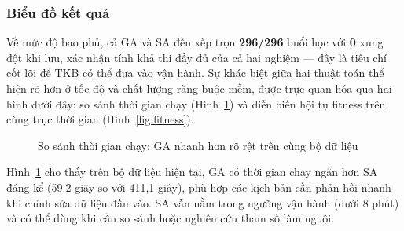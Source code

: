 \documentclass[a4paper,12pt,oneside]{article}
\begin{document}
	\subsubsection{Biểu đồ kết quả}
	
	Về mức độ bao phủ, cả GA và SA đều xếp trọn \textbf{296/296} buổi học với \textbf{0} xung đột khi lưu, xác nhận tính khả thi đầy đủ của cả hai nghiệm --- đây là tiêu chí cốt lõi để TKB có thể đưa vào vận hành. Sự khác biệt giữa hai thuật toán thể hiện rõ hơn ở tốc độ và chất lượng ràng buộc mềm, được trực quan hóa qua hai hình dưới đây: so sánh thời gian chạy (Hình~\ref{fig:runtime}) và diễn biến hội tụ fitness trên cùng trục thời gian (Hình~\ref{fig:fitness}).
	
	\begin{figure}[H]
		\centering
		\caption{So sánh thời gian chạy: GA nhanh hơn rõ rệt trên cùng bộ dữ liệu}
		\label{fig:runtime}
	\end{figure}
	
	Hình~\ref{fig:runtime} cho thấy trên bộ dữ liệu hiện tại, GA có thời gian chạy ngắn hơn SA đáng kể (59{,}2 giây so với 411{,}1 giây), phù hợp các kịch bản cần phản hồi nhanh khi chỉnh sửa dữ liệu đầu vào. SA vẫn nằm trong ngưỡng vận hành (dưới 8 phút) và có thể dùng khi cần so sánh hoặc nghiên cứu tham số làm nguội.
	
\end{document}
